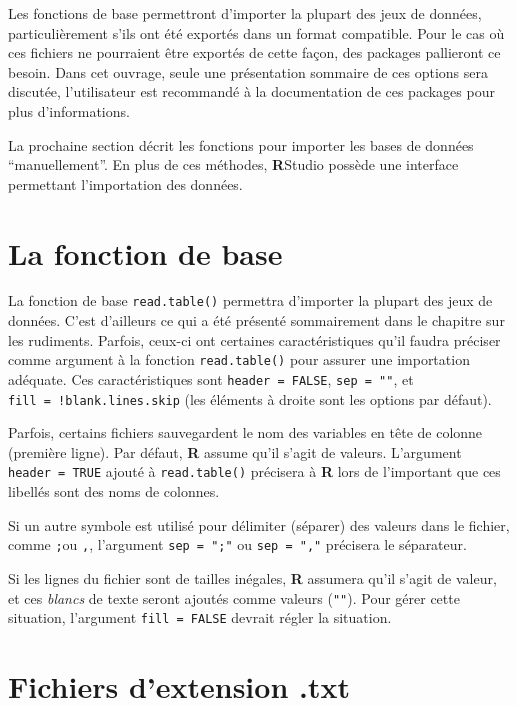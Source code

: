 \documentclass[
]{book}
\begin{document}
Les fonctions de base permettront d'importer la plupart des jeux de données, particulièrement s'ils ont été exportés dans un format compatible. Pour le cas où ces fichiers ne pourraient être exportés de cette façon, des packages pallieront ce besoin. Dans cet ouvrage, seule une présentation sommaire de ces options sera discutée, l'utilisateur est recommandé à la documentation de ces packages pour plus d'informations.

La prochaine section décrit les fonctions pour importer les bases de données ``manuellement''. En plus de ces méthodes, \textbf{R}Studio possède une interface permettant l'importation des données.

\hypertarget{la-fonction-de-base}{%
\section{La fonction de base}\label{la-fonction-de-base}}

La fonction de base \texttt{read.table()} permettra d'importer la plupart des jeux de données. C'est d'ailleurs ce qui a été présenté sommairement dans le chapitre sur les rudiments. Parfois, ceux-ci ont certaines caractéristiques qu'il faudra préciser comme argument à la fonction \texttt{read.table()} pour assurer une importation adéquate. Ces caractéristiques sont \texttt{header\ =\ FALSE}, \texttt{sep\ =\ ""}, et \texttt{fill\ =\ !blank.lines.skip} (les éléments à droite sont les options par défaut).

Parfois, certains fichiers sauvegardent le nom des variables en tête de colonne (première ligne). Par défaut, \textbf{R} assume qu'il s'agit de valeurs. L'argument \texttt{header\ =\ TRUE} ajouté à \texttt{read.table()} précisera à \textbf{R} lors de l'important que ces libellés sont des noms de colonnes.

Si un autre symbole est utilisé pour délimiter (séparer) des valeurs dans le fichier, comme \texttt{;}ou \texttt{,}, l'argument \texttt{sep\ =\ ";"} ou \texttt{sep\ =\ ","} précisera le séparateur.

Si les lignes du fichier sont de tailles inégales, \textbf{R} assumera qu'il s'agit de valeur, et ces \emph{blancs} de texte seront ajoutés comme valeurs (\texttt{""}). Pour gérer cette situation, l'argument \texttt{fill\ =\ FALSE} devrait régler la situation.

\hypertarget{fichiers-dextension-.txt}{%
\section{Fichiers d'extension .txt}\label{fichiers-dextension-.txt}}
\end{document}
